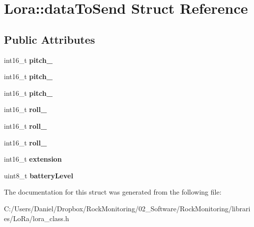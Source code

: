 \hypertarget{struct_lora_1_1data_to_send}{}\section{Lora\+:\+:data\+To\+Send Struct Reference}
\label{struct_lora_1_1data_to_send}
\subsection*{Public Attributes}
\begin{DoxyCompactItemize}
\item 
int16\+\_\+t {\bfseries pitch\+\_}\hypertarget{struct_lora_1_1data_to_send_a03eec09b6038092c4ca7beea0f76a717}{}\label{struct_lora_1_1data_to_send_a03eec09b6038092c4ca7beea0f76a717}

\item 
int16\+\_\+t {\bfseries pitch\+\_}\hypertarget{struct_lora_1_1data_to_send_a02e04c68c418e536c98632a4db83b46f}{}\label{struct_lora_1_1data_to_send_a02e04c68c418e536c98632a4db83b46f}

\item 
int16\+\_\+t {\bfseries pitch\+\_}\hypertarget{struct_lora_1_1data_to_send_a3b704a341de42261467b3582db4f0e65}{}\label{struct_lora_1_1data_to_send_a3b704a341de42261467b3582db4f0e65}

\item 
int16\+\_\+t {\bfseries roll\+\_}\hypertarget{struct_lora_1_1data_to_send_a7c8f393571595a55b6ef37b4c8c0ed60}{}\label{struct_lora_1_1data_to_send_a7c8f393571595a55b6ef37b4c8c0ed60}

\item 
int16\+\_\+t {\bfseries roll\+\_}\hypertarget{struct_lora_1_1data_to_send_a59755cd40db115e4844f682a35f1e7f0}{}\label{struct_lora_1_1data_to_send_a59755cd40db115e4844f682a35f1e7f0}

\item 
int16\+\_\+t {\bfseries roll\+\_}\hypertarget{struct_lora_1_1data_to_send_a271f75b7398fe5d049d3381adb02d428}{}\label{struct_lora_1_1data_to_send_a271f75b7398fe5d049d3381adb02d428}

\item 
int16\+\_\+t {\bfseries extension}\hypertarget{struct_lora_1_1data_to_send_ac56a884c761ab5f05a4762cb655699c3}{}\label{struct_lora_1_1data_to_send_ac56a884c761ab5f05a4762cb655699c3}

\item 
uint8\+\_\+t {\bfseries battery\+Level}\hypertarget{struct_lora_1_1data_to_send_aaf1e68698618d05f9e0ab96d0b53b561}{}\label{struct_lora_1_1data_to_send_aaf1e68698618d05f9e0ab96d0b53b561}

\end{DoxyCompactItemize}


The documentation for this struct was generated from the following file\+:\begin{DoxyCompactItemize}
\item 
C\+:/\+Users/\+Daniel/\+Dropbox/\+Rock\+Monitoring/02\+\_\+\+Software/\+Rock\+Monitoring/libraries/\+Lo\+Ra/lora\+\_\+class.\+h\end{DoxyCompactItemize}
